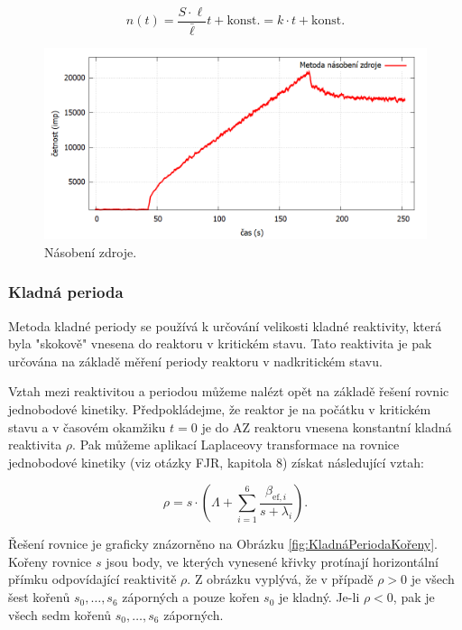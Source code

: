 \begin{equation*}
 n(t) = \frac{S \cdot \ell}{\bar{\ell}} t + \text{konst.} = k\cdot t + \text{konst.}
\end{equation*}

\begin{figure}[H]
    \centering
    \includegraphics[scale=0.4]{img/NásobeníZdroje.png}
    \caption{Násobení zdroje.}
    \label{fig:NásobeníZdroje}
\end{figure}

\subsubsection{Kladná perioda}

Metoda kladné periody se používá k určování velikosti kladné reaktivity, která byla "skokově" vnesena do reaktoru v kritickém stavu. Tato reaktivita je pak určována na základě měření periody reaktoru v nadkritickém stavu.

Vztah mezi reaktivitou a periodou můžeme nalézt opět na základě řešení rovnic jednobodové kinetiky. Předpokládejme, že reaktor je na počátku v kritickém stavu a v časovém okamžiku $ t = 0 $ je do AZ reaktoru vnesena konstantní kladná reaktivita $ \rho $. Pak můžeme aplikací Laplaceovy transformace na rovnice jednobodové kinetiky (viz otázky FJR, kapitola 8) získat následující vztah:

\begin{equation}
\boxed{ \rho = s \cdot \left( \Lambda + \sum_{i=1}^6 \frac{\beta_{\text{ef},i}}{s + \lambda_i} \right).}
\end{equation}

Řešení rovnice je graficky znázorněno na Obrázku \ref{fig:KladnáPeriodaKořeny}. Kořeny rovnice $ s $ jsou body, ve kterých vynesené křivky protínají horizontální přímku odpovídající reaktivitě $ \rho $. Z obrázku vyplývá, že v případě $ \rho > 0 $ je všech šest kořenů $ s_0, \ldots, s_6 $ záporných a pouze kořen $ s_0 $ je kladný. Je-li $ \rho < 0 $, pak je všech sedm kořenů $ s_0, \ldots, s_6 $ záporných.

